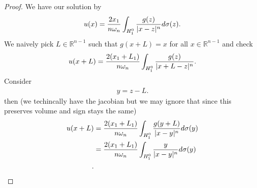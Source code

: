 \begin{proof}
 We have our solution by 
 \begin{align*}
   u(x) = \frac{2x_{1}}{n \omega_n} \int_{H_1^{0} } \frac{g(z)}{\lvert x-z\rvert^{n} } d \sigma(z)
 .\end{align*}
 We naively pick $L \in  \mathbb{R}^{n-1} $ such that $g(x+L) = x$ for all $x \in  \mathbb{R}^{n-1} $ and check
 \begin{align*}
   u(x + L) = \frac{2(x_{1}+L_1)}{n\omega_n} \int_{H_{1}^{0} } \frac{g(z)}{\lvert x+L-z\rvert^{n} }
 .\end{align*}
 Consider 
 \begin{align*}
   y = z-L
 .\end{align*}
 then (we techincally have the jacobian but we may ignore that since this preserves volume and sign stays the same)
 \begin{align*}
   u(x+L) &=   \frac{2(x_{1}+L_1)}{n\omega_n} \int_{H_{1}^{0} } \frac{g(y+L)}{\lvert x-y\rvert^{n} } d\sigma(y)\\
          &= \frac{2(x_{1}+L_1)}{n\omega_n} \int_{H_{1}^{0} } \frac{y}{\lvert x-y\rvert^{n} } d\sigma(y)\\
 .\end{align*}

\end{proof}
